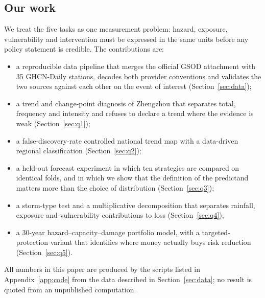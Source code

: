 \subsection{Our work}

We treat the five tasks as one measurement problem: hazard, exposure, vulnerability and intervention must be expressed in the same units before any policy statement is credible. The contributions are:

\begin{itemize}[leftmargin=1.4em,itemsep=1pt]
\item a reproducible data pipeline that merges the official GSOD attachment with 35 GHCN-Daily stations, decodes both provider conventions and validates the two sources against each other on the event of interest (Section~\ref{sec:data});
\item a trend and change-point diagnosis of Zhengzhou that separates total, frequency and intensity and refuses to declare a trend where the evidence is weak (Section~\ref{sec:q1});
\item a false-discovery-rate controlled national trend map with a data-driven regional classification (Section~\ref{sec:q2});
\item a held-out forecast experiment in which ten strategies are compared on identical folds, and in which we show that the definition of the predictand matters more than the choice of distribution (Section~\ref{sec:q3});
\item a storm-type test and a multiplicative decomposition that separates rainfall, exposure and vulnerability contributions to loss (Section~\ref{sec:q4});
\item a 30-year hazard--capacity--damage portfolio model, with a targeted-protection variant that identifies where money actually buys risk reduction (Section~\ref{sec:q5}).
\end{itemize}

All numbers in this paper are produced by the scripts listed in Appendix~\ref{app:code} from the data described in Section~\ref{sec:data}; no result is quoted from an unpublished computation.